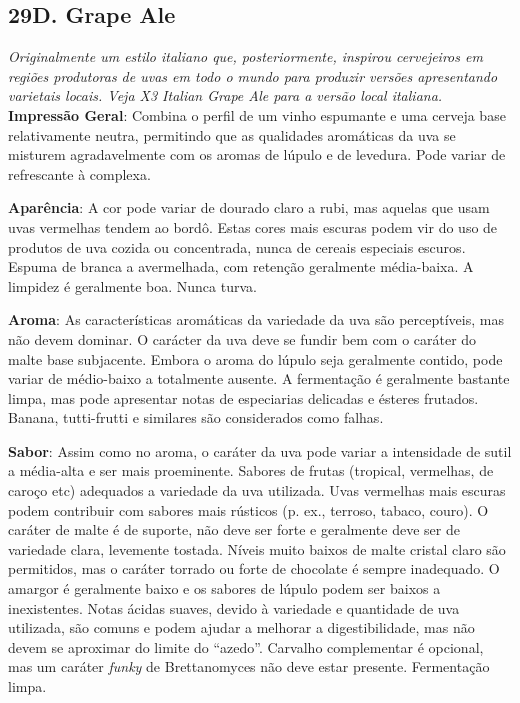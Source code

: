 \subsection*{29D. Grape Ale}
\textit{Originalmente um estilo italiano que, posteriormente, inspirou cervejeiros em regiões produtoras de uvas em todo o mundo para produzir versões apresentando varietais locais. Veja X3 Italian Grape Ale para a versão local italiana.}\\
\textbf{Impressão Geral}: Combina o perfil de um vinho espumante e uma cerveja base relativamente neutra, permitindo que as qualidades aromáticas da uva se misturem agradavelmente com os aromas de lúpulo e de levedura. Pode variar de refrescante à complexa.

\textbf{Aparência}: A cor pode variar de dourado claro a rubi, mas aquelas que usam uvas vermelhas tendem ao bordô. Estas cores mais escuras podem vir do uso de produtos de uva cozida ou concentrada, nunca de cereais especiais escuros. Espuma de branca a avermelhada, com retenção geralmente média-baixa. A limpidez é geralmente boa. Nunca turva.

\textbf{Aroma}: As características aromáticas da variedade da uva são perceptíveis, mas não devem dominar. O carácter da uva deve se fundir bem com o caráter do malte base subjacente. Embora o aroma do lúpulo seja geralmente contido, pode variar de médio-baixo a totalmente ausente. A fermentação é geralmente bastante limpa, mas pode apresentar notas de especiarias delicadas e ésteres frutados. Banana, tutti-frutti e similares são considerados como falhas.

\textbf{Sabor}: Assim como no aroma, o caráter da uva pode variar a intensidade de sutil a média-alta e ser mais proeminente. Sabores de frutas (tropical, vermelhas, de caroço etc) adequados a variedade da uva utilizada. Uvas vermelhas mais escuras podem contribuir com sabores mais rústicos (p. ex., terroso, tabaco, couro). O caráter de malte é de suporte, não deve ser forte e geralmente deve ser de variedade clara, levemente tostada. Níveis muito baixos de malte cristal claro são permitidos, mas o caráter torrado ou forte de chocolate é sempre inadequado. O amargor é geralmente baixo e os sabores de lúpulo podem ser baixos a inexistentes. Notas ácidas suaves, devido à variedade e quantidade de uva utilizada, são comuns e podem ajudar a melhorar a digestibilidade, mas não devem se aproximar do limite do “azedo”. Carvalho complementar é opcional, mas um caráter \textit{funky} de Brettanomyces não deve estar presente. Fermentação limpa.

